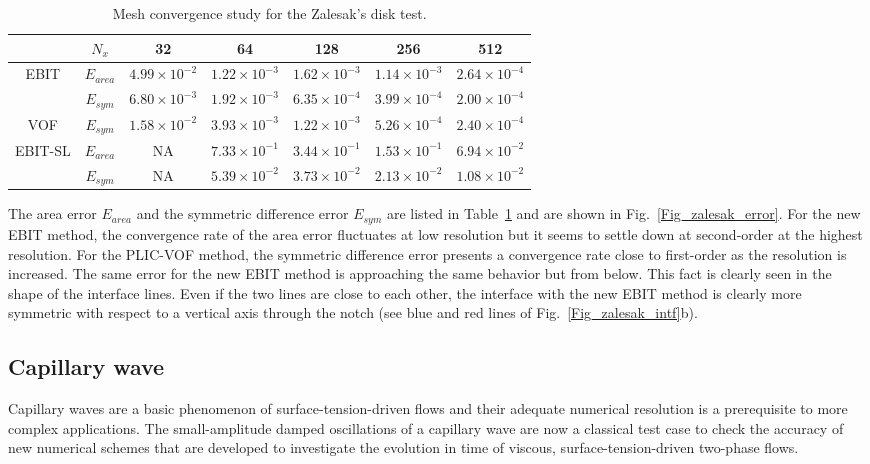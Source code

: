 \begin{table}[hbt!]
\footnotesize
\caption{Mesh convergence study for the Zalesak's disk test.}
\centering
\begin{tabular}{cc|ccccc}
\hline 
 &$N_x$& 32 & 64 & 128 & 256 & 512\\ 
\hline 
EBIT &$E_{area}$ & $4.99 \times 10^{-2}$ & $1.22 \times 10^{-3}$ & $1.62 \times 10^{-3}$ & $1.14 \times 10^{-3}$ & $2.64 \times 10^{-4}$\\ 
&$E_{sym}$ & $6.80 \times 10^{-3}$ & $1.92 \times 10^{-3}$ & $6.35 \times 10^{-4}$ & $3.99 \times 10^{-4}$ & $2.00 \times 10^{-4}$\\
\hline 
VOF & $E_{sym}$ & $1.58 \times 10^{-2}$ & $3.93 \times 10^{-3}$ & $1.22 \times 10^{-3}$ & $5.26 \times 10^{-4}$ & $2.40 \times 10^{-4}$\\
\hline 
EBIT-SL &$E_{area}$ & NA & $7.33 \times 10^{-1}$ & $3.44 \times 10^{-1}$ & $ 1.53 \times 10^{-1}$ & $ 6.94 \times 10^{-2}$\\ 
&$E_{sym}$ & NA & $5.39 \times 10^{-2}$ & $3.73 \times 10^{-2}$ & $2.13 \times 10^{-2}$ & $1.08 \times 10^{-2}$\\
\hline 
\end{tabular}
\label{Tab_zalesak_error}
\normalsize
\end{table}

The area error $E_{area}$ and the symmetric difference error $E_{sym}$ are listed in Table~\ref{Tab_zalesak_error} and are shown in Fig.~\ref{Fig_zalesak_error}. For the new EBIT method, the convergence rate of the area error fluctuates at low resolution but it seems to settle down at second-order at the highest resolution. For the PLIC-VOF method, the symmetric difference error presents a convergence rate close to first-order as the resolution is increased. The same error for the new EBIT method is approaching the same behavior but from below. This fact is clearly seen in the shape of the interface lines. Even if the two lines are close to each other, the interface with the new EBIT method is clearly more symmetric with respect to a vertical axis through the notch (see blue and red lines of Fig.~\ref{Fig_zalesak_intf}b).

\subsection{Capillary wave}

Capillary waves are a basic phenomenon of surface-tension-driven flows and their adequate numerical resolution is a prerequisite to more complex applications. The small-amplitude damped oscillations of a capillary wave are now a classical test case to check the accuracy of new numerical schemes that are developed to investigate the evolution in time of viscous, surface-tension-driven two-phase flows.

